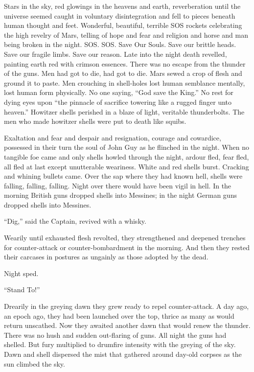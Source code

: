 Stars in the sky, red glowings in the heavens and earth, reverberation until the universe seemed caught in voluntary disintegration and fell to pieces beneath human thought and feet. Wonderful, beautiful, terrible SOS rockets celebrating the high revelry of Mars, telling of hope and fear and religion and horse and man being broken in the night. SOS. SOS. Save Our Souls. Save our brittle heads. Save our fragile limbs. Save our reason. Late into the night death revelled, painting earth red with crimson essences. There was no escape from the thunder of the guns. Men had got to die, had got to die. Mars sewed a crop of flesh and ground it to paste. Men crouching in shell-holes lost human semblance mentally, lost human form physically. No one saying, ``God save the King.'' No rest for dying eyes upon ``the pinnacle of sacrifice towering like a rugged finger unto heaven.'' Howitzer shells perished in a blaze of light, veritable thunderbolts. The men who made howitzer shells were put to death like squibs.

Exaltation and fear and despair and resignation, courage and cowardice, possessed in their turn the soul of John Guy as he flinched in the night. When no tangible foe came and only shells howled through the night, ardour fled, fear fled, all fled at last except unutterable weariness. White and red shells burst. Cracking and whining bullets came. Over the sap where they had known hell, shells were falling, falling, falling. Night over there would have been vigil in hell. In the morning British guns dropped shells into Messines; in the night German guns dropped shells into Messines.

``Dig,'' said the Captain, revived with a whisky.

Wearily until exhausted flesh revolted, they strengthened and deepened trenches for counter-attack or counter-bombardment in the morning. And then they rested their carcases in postures as ungainly as those adopted by the dead.

Night sped.

``Stand To!''

Drearily in the greying dawn they grew ready to repel counter-attack. A day ago, an epoch ago, they had been launched over the top, thrice as many as would return unscathed. Now they awaited another dawn that would renew the thunder. There was no hush and sudden out-flaring of guns. All night the guns had shelled. But fury multiplied to drumfire intensity with the greying of the sky. Dawn and shell dispersed the mist that gathered around day-old corpses as the sun climbed the sky.

